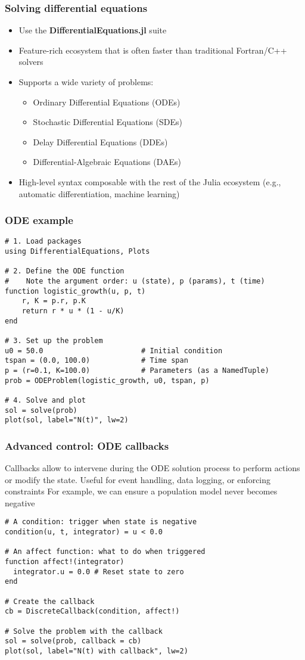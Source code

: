 \documentclass[aspectratio=169]{beamer}\usepackage[]{graphicx}\usepackage[]{xcolor}
\begin{document}
\begin{frame}
  \frametitle{Solving differential equations}
  \begin{itemize}
    \item Use the \textbf{DifferentialEquations.jl} suite
    \vfill
    \item Feature-rich ecosystem that is often faster than traditional Fortran/C++ solvers
    \vfill
    \item Supports a wide variety of problems:
    \begin{itemize}
        \item Ordinary Differential Equations (ODEs)
        \item Stochastic Differential Equations (SDEs)
        \item Delay Differential Equations (DDEs)
        \item Differential-Algebraic Equations (DAEs)
    \end{itemize}
    \vfill
    \item High-level syntax composable with the rest of the Julia ecosystem (e.g., automatic differentiation, machine learning)
  \end{itemize}
\end{frame}

\begin{frame}[fragile]
  \frametitle{ODE example}
  \begin{lstlisting}
# 1. Load packages
using DifferentialEquations, Plots

# 2. Define the ODE function
#    Note the argument order: u (state), p (params), t (time)
function logistic_growth(u, p, t)
    r, K = p.r, p.K
    return r * u * (1 - u/K)
end

# 3. Set up the problem
u0 = 50.0                       # Initial condition
tspan = (0.0, 100.0)            # Time span
p = (r=0.1, K=100.0)            # Parameters (as a NamedTuple)
prob = ODEProblem(logistic_growth, u0, tspan, p)

# 4. Solve and plot
sol = solve(prob)
plot(sol, label="N(t)", lw=2)\end{lstlisting}
\end{frame}

\begin{frame}[fragile]
  \frametitle{Advanced control: ODE callbacks}
\bbullet Callbacks allow to intervene during the ODE solution process to perform actions or modify the state. Useful for event handling, data logging, or enforcing constraints
\vfill
\bbullet For example, we can ensure a population model never becomes negative
\vfill
\begin{lstlisting}
# A condition: trigger when state is negative
condition(u, t, integrator) = u < 0.0

# An affect function: what to do when triggered
function affect!(integrator)
  integrator.u = 0.0 # Reset state to zero
end

# Create the callback
cb = DiscreteCallback(condition, affect!)

# Solve the problem with the callback
sol = solve(prob, callback = cb)
plot(sol, label="N(t) with callback", lw=2)\end{lstlisting}
\end{frame}
\end{document}
